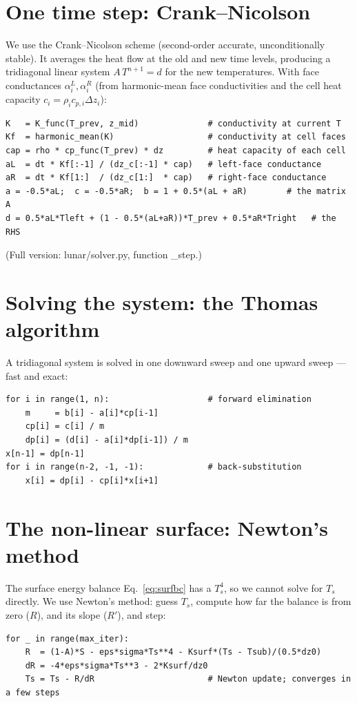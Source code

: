 \documentclass[11pt]{report}
\newcommand{\code}[1]{{\ttfamily\small #1}}
\begin{document}
\section{One time step: Crank--Nicolson}
We use the Crank--Nicolson scheme (second-order accurate, unconditionally
stable). It averages the heat flow at the old and new time levels, producing a
tridiagonal linear system $A\,T^{n+1}=d$ for the new temperatures. With
face conductances $\alpha^{L}_i,\alpha^{R}_i$ (from harmonic-mean face
conductivities and the cell heat capacity $c_i=\rho_i c_{p,i}\Delta z_i$):
\begin{lstlisting}[style=py]
K   = K_func(T_prev, z_mid)              # conductivity at current T
Kf  = harmonic_mean(K)                   # conductivity at cell faces
cap = rho * cp_func(T_prev) * dz         # heat capacity of each cell
aL  = dt * Kf[:-1] / (dz_c[:-1] * cap)   # left-face conductance
aR  = dt * Kf[1:]  / (dz_c[1:]  * cap)   # right-face conductance
a = -0.5*aL;  c = -0.5*aR;  b = 1 + 0.5*(aL + aR)        # the matrix A
d = 0.5*aL*Tleft + (1 - 0.5*(aL+aR))*T_prev + 0.5*aR*Tright   # the RHS
\end{lstlisting}
(Full version: \code{lunar/solver.py}, function \code{\_step}.)

\section{Solving the system: the Thomas algorithm}
A tridiagonal system is solved in one downward sweep and one upward sweep ---
fast and exact:
\begin{lstlisting}[style=py]
for i in range(1, n):                    # forward elimination
    m     = b[i] - a[i]*cp[i-1]
    cp[i] = c[i] / m
    dp[i] = (d[i] - a[i]*dp[i-1]) / m
x[n-1] = dp[n-1]
for i in range(n-2, -1, -1):             # back-substitution
    x[i] = dp[i] - cp[i]*x[i+1]
\end{lstlisting}

\section{The non-linear surface: Newton's method}
The surface energy balance Eq.~\eqref{eq:surfbc} has a $T_s^4$, so we cannot solve
for $T_s$ directly. We use Newton's method: guess $T_s$, compute how far the
balance is from zero ($R$), and its slope ($R'$), and step:
\begin{lstlisting}[style=py]
for _ in range(max_iter):
    R  = (1-A)*S - eps*sigma*Ts**4 - Ksurf*(Ts - Tsub)/(0.5*dz0)
    dR = -4*eps*sigma*Ts**3 - 2*Ksurf/dz0
    Ts = Ts - R/dR                       # Newton update; converges in a few steps
\end{lstlisting}
\end{document}
